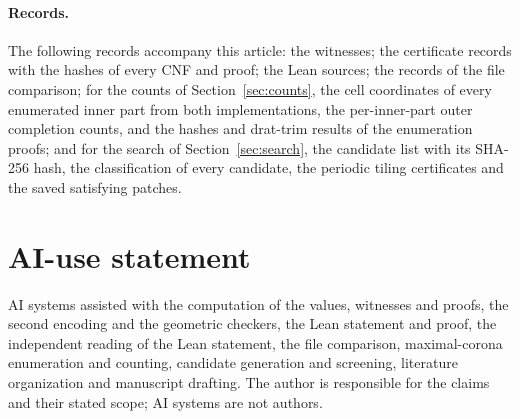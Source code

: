 \documentclass[10pt,a4paper]{article}
\theoremstyle{definition}
\theoremstyle{remark}
\begin{document}
\paragraph{Records.}
The following records accompany this article: the witnesses; the
certificate records with the hashes of every CNF and proof; the Lean
sources; the records of the file comparison; for the counts of
Section~\ref{sec:counts}, the cell coordinates of every enumerated inner
part from both implementations, the per-inner-part outer completion
counts, and the hashes and drat-trim results of the enumeration proofs;
and for the search of Section~\ref{sec:search}, the candidate list with
its SHA-256 hash, the classification of every candidate, the periodic
tiling certificates and the saved satisfying patches.

\section*{AI-use statement}
AI systems assisted with the computation of the values, witnesses and
proofs, the second encoding and the geometric checkers, the Lean
statement and proof, the independent reading of the Lean statement, the
file comparison, maximal-corona enumeration and counting, candidate
generation and screening, literature organization and manuscript drafting. The
author is responsible for the claims and their stated scope; AI systems
are not authors.
\end{document}
